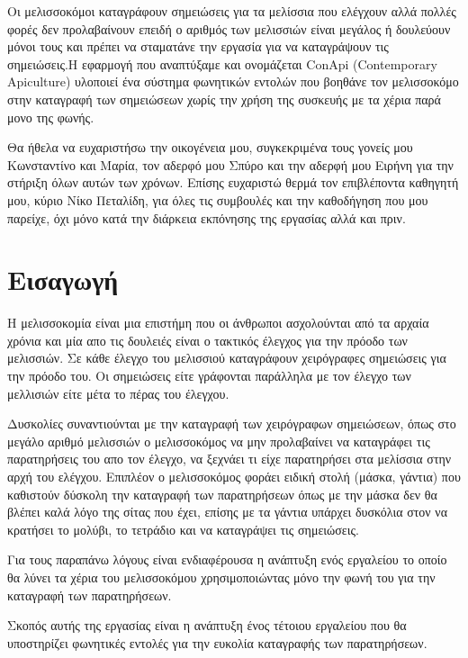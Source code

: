 \documentclass[oneside, 12pt]{book}
\begin{document}
\Titlepage
\Declarationpage
\begin{Abstract}
  Οι μελισσοκόμοι καταγράφουν σημειώσεις για τα μελίσσια που ελέγχουν αλλά πολλές φορές δεν προλαβαίνουν επειδή ο αριθμός των μελισσιών είναι μεγάλος ή δουλεύουν μόνοι τους και πρέπει να σταματάνε την εργασία για να καταγράψουν τις σημειώσεις.Η εφαρμογή που αναπτύξαμε και ονομάζεται ConApi (Contemporary Apiculture) υλοποιεί ένα σύστημα φωνητικών εντολών που βοηθάνε τον μελισσοκόμο στην καταγραφή των σημειώσεων χωρίς την χρήση της συσκευής με τα χέρια παρά μονο της φωνής.
\end{Abstract}
\tableofcontents

\listoftables
\listoffigures


\begin{Acknowledgement}
Θα ήθελα να ευχαριστήσω την οικογένεια μου, συγκεκριμένα τους γονείς μου Κωνσταντίνο και Μαρία, τον αδερφό μου Σπύρο και την αδερφή μου Ειρήνη για την στήριξη όλων αυτών των χρόνων. Επίσης ευχαριστώ θερμά τον επιβλέποντα καθηγητή μου, κύριο Νίκο Πεταλίδη, για όλες τις συμβουλές και την καθοδήγηση που μου παρείχε, όχι μόνο κατά την διάρκεια εκπόνησης της εργασίας αλλά και πριν.
\end{Acknowledgement}


\chapter{Εισαγωγή}\label{ch:εισαγωγή}
\leftmark\rightmark
Η μελισσοκομία είναι μια επιστήμη που οι άνθρωποι ασχολούνται από τα αρχαία χρόνια και μία απο τις
δουλειές είναι ο τακτικός έλεγχος για την πρόοδο των μελισσιών.
Σε κάθε έλεγχο του μελισσιού καταγράφουν χειρόγραφες σημειώσεις για την πρόοδο του.
Οι σημειώσεις είτε γράφονται παράλληλα με τον έλεγχο των μελλισιών είτε μέτα το πέρας του έλεγχου. \par
Δυσκολίες συναντιούνται με την καταγραφή των χειρόγραφων σημειώσεων, όπως στο μεγάλο αριθμό μελισσιών
ο μελισσοκόμος να μην προλαβαίνει να καταγράφει τις παρατηρήσεις του απο τον έλεγχο, να ξεχνάει τι
είχε παρατηρήσει στα μελίσσια στην αρχή του ελέγχου.
Επιπλέον ο μελισσοκόμος φοράει ειδική στολή (μάσκα, γάντια) που καθιστούν δύσκολη την καταγραφή των
παρατηρήσεων όπως με την μάσκα δεν θα βλέπει καλά λόγο της σίτας που έχει, επίσης με τα γάντια
υπάρχει δυσκόλια στον να κρατήσει το μολύβι, το τετράδιο και να καταγράψει τις σημειώσεις. \par
Για τους παραπάνω λόγους είναι ενδιαφέρουσα η ανάπτυξη ενός εργαλείου το οποίο θα λύνει τα χέρια του
μελισσοκόμου χρησιμοποιώντας μόνο την φωνή του για την καταγραφή των παρατηρήσεων. \par
Σκοπός αυτής της εργασίας είναι η ανάπτυξη ένος τέτοιου εργαλείου που θα υποστηρίζει φωνητικές
εντολές για την ευκολία καταγραφής των παρατηρήσεων.
\end{document}

